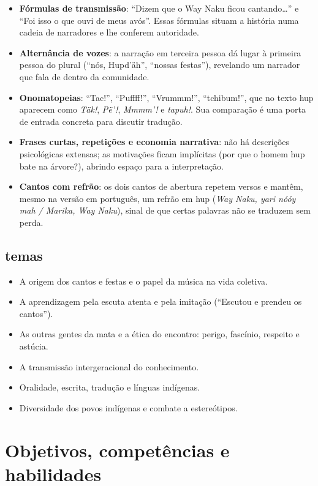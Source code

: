 \begin{itemize}
\item \textbf{Fórmulas de transmissão}: ``Dizem que o Way
Naku ficou cantando\ldots'' e ``Foi isso o que ouvi de meus avós''.
Essas fórmulas situam a história numa cadeia de narradores e lhe
conferem autoridade.
\item \textbf{Alternância de vozes}: a narração em terceira
pessoa dá lugar à primeira pessoa do plural (``nós, Hupd'äh'', ``nossas
festas''), revelando um narrador que fala de dentro da comunidade.
\item \textbf{Onomatopeias}: ``Tac!'', ``Puffff!'',
``Vrummm!'', ``tchibum!'', que no texto hup aparecem como \textit{Täk!},
\textit{Pë'!}, \textit{Mmmm'!} e \textit{tapuh!}. Sua comparação é uma
porta de entrada concreta para discutir tradução.
\item \textbf{Frases curtas, repetições e economia
narrativa}: não há descrições psicológicas extensas; as motivações
ficam implícitas (por que o homem hup bate na árvore?), abrindo espaço
para a interpretação.
\item \textbf{Cantos com refrão}: os dois cantos de abertura
repetem versos e mantêm, mesmo na versão em português, um refrão em hup
(\textit{Way Naku, yari nóóy mah / Marika, Way Naku}), sinal de que
certas palavras não se traduzem sem perda.
\end{itemize}

\section{temas}

\begin{itemize}
\item A origem dos cantos e festas e o papel da música na vida coletiva.
\item A aprendizagem pela escuta atenta e pela imitação (``Escutou e
prendeu os cantos'').
\item As outras gentes da mata e a ética do encontro: perigo, fascínio,
respeito e astúcia.
\item A transmissão intergeracional do conhecimento.
\item Oralidade, escrita, tradução e línguas indígenas.
\item Diversidade dos povos indígenas e combate a estereótipos.
\end{itemize}

\chapter{Objetivos, competências e habilidades}


